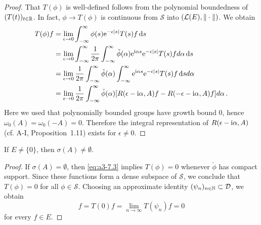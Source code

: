 \begin{proof}
That $T(\phi)$ is well-defined follows from the polynomial boundedness of $(T(t))_{t\in\mathbb{R}}$.
In fact, $\phi \to T(\phi)$ is continuous from $\mathcal{S}$ into $(\mathcal{L}(E),\|\cdot\|)$.
We obtain
\begin{align*}
T(\phi)f &= \lim_{\epsilon\to 0} \int_{-\infty}^{\infty} \phi(s)\mathrm{e}^{-\epsilon|s|}T(s)f \mathop{}\!\mathrm{d}{s} \\
&= \lim_{\epsilon\to 0} \int_{-\infty}^{\infty} \frac{1}{2\pi}\int_{-\infty}^{\infty} \check{\phi}(\alpha)\mathrm{e}^{\mathrm{i}\alpha s}\mathrm{e}^{-\epsilon|s|}T(s)f d\alpha \mathop{}\!\mathrm{d}{s} \\
&= \lim_{\epsilon\to 0} \frac{1}{2\pi}\int_{-\infty}^{\infty} \check{\phi}(\alpha)\int_{-\infty}^{\infty} \mathrm{e}^{\mathrm{i}\alpha s}\mathrm{e}^{-\epsilon|s|}T(s)f \mathop{}\!\mathrm{d}{s} d\alpha \\
&= \lim_{\epsilon\to 0} \frac{1}{2\pi}\int_{-\infty}^{\infty} \check{\phi}(\alpha)[R(\epsilon-\mathrm{i}\alpha,A)f - R(-\epsilon-\mathrm{i}\alpha,A)f] d\alpha \,.
\end{align*}
Here we used that polynomially bounded groups have growth bound $0$, hence $\omega_{0}(A) = \omega_{0}(-A) = 0$.
Therefore the integral representation of $R(\epsilon-\mathrm{i}\alpha,A)$ (cf. A-I, Proposition~1.11) exists for $\epsilon \neq 0$.
\end{proof}
\begin{lemma}\label{lem:a3-7.6}
If $E \neq \{0\}$, then $\sigma(A) \neq \emptyset$.
\end{lemma}
\begin{proof}
If $\sigma(A) = \emptyset$, then \eqref{eq:a3-7.3} implies $T(\phi) = 0$ whenever $\check{\phi}$ has compact support.
Since these functions form a dense subspace of $\mathcal{S}$, we conclude that $T(\phi) = 0$ for all $\phi \in \mathcal{S}$.
Choosing an approximate identity $(\psi_{n})_{n\in\mathbb{N}} \subset \mathcal{D}$, we obtain
\[
f = T(0)f = \lim_{n\to\infty} T(\psi_{n})f = 0
\]
for every $f \in E$.
\end{proof}
